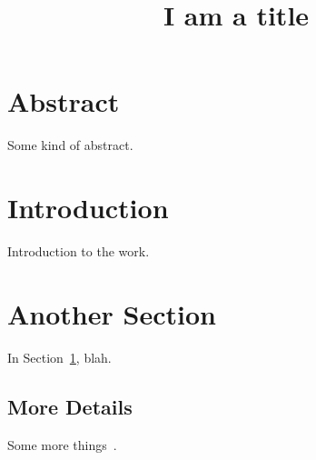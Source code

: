 \documentclass[11pt, times, letter]{article}
\begin{document}
\title{I am a title}

\maketitle

\section*{Abstract}

Some kind of abstract.

\section{Introduction}
\label{intro}

Introduction to the work.


\section{Another Section}
\label{other}

In Section~\ref{intro}, blah.

\subsection{More Details}

Some more things~\cite{aaa1990}.

\pagebreak



\end{document}
